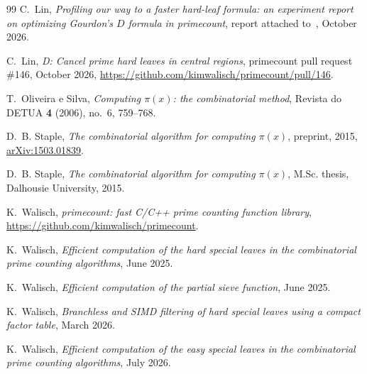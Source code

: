 \documentclass[11pt,a4paper]{amsart}
\numberwithin{equation}{section}
\begin{document}
\begin{thebibliography}{99}
C.~Lin, \emph{Profiling our way to a faster hard-leaf formula: an experiment
report on optimizing Gourdon's $D$ formula in primecount}, report attached
to~\cite{PR146}, October 2026.

C.~Lin, \emph{D: Cancel prime hard leaves in central regions}, primecount pull
request \#146, October 2026,
\url{https://github.com/kimwalisch/primecount/pull/146}.

T.~Oliveira e Silva, \emph{Computing $\pi(x)$: the combinatorial method},
Revista do DETUA \textbf{4} (2006), no.~6, 759--768.

D.~B. Staple, \emph{The combinatorial algorithm for computing $\pi(x)$},
preprint, 2015, \href{https://arxiv.org/abs/1503.01839}{arXiv:1503.01839}.

D.~B. Staple, \emph{The combinatorial algorithm for computing $\pi(x)$}, M.Sc.
thesis, Dalhousie University, 2015.

K.~Walisch, \emph{primecount: fast C/C++ prime counting function library},
\url{https://github.com/kimwalisch/primecount}.

K.~Walisch, \emph{Efficient computation of the hard special leaves in the
combinatorial prime counting algorithms}, June 2025.

K.~Walisch, \emph{Efficient computation of the partial sieve function}, June
2025.

K.~Walisch, \emph{Branchless and SIMD filtering of hard special leaves using a
compact factor table}, March 2026.

K.~Walisch, \emph{Efficient computation of the easy special leaves in the
combinatorial prime counting algorithms}, July 2026.

\end{thebibliography}
\end{document}
